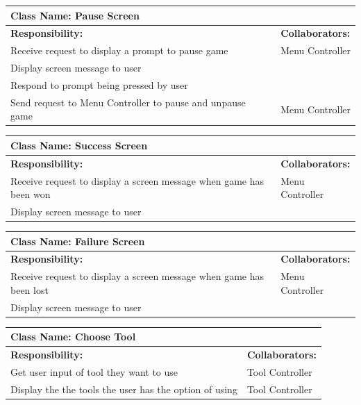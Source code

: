 \documentclass[12pt, titlepage]{article}
\begin{document}
\begin{enumerate}[a)]
	\begin{table}[H]
		\centering
		\begin{tabular}{|p{5cm}|p{5cm}|}
		\hline 
		 \multicolumn{2}{|l|}{\textbf{Class Name: Pause Screen}} \\
		\hline
		\textbf{Responsibility:} & \textbf{Collaborators:} \\
		\hline
		 Receive request to display a prompt to pause game& Menu Controller \\
		\hline
		 Display screen message to user& \\
		\hline
		 Respond to prompt being pressed by user& \\
		\hline
		 Send request to Menu Controller to pause and unpause game& Menu Controller \\
		\hline
		\end{tabular}
	\end{table}
	
	\begin{table}[H]
		\centering
		\begin{tabular}{|p{5cm}|p{5cm}|}
		\hline 
		 \multicolumn{2}{|l|}{\textbf{Class Name: Success Screen}} \\
		\hline
		\textbf{Responsibility:} & \textbf{Collaborators:} \\
		\hline
		 Receive request to display a screen message when game has been won& Menu Controller \\
		\hline
		 Display screen message to user& \\
		\hline
		\end{tabular}
	\end{table}
	
	\begin{table}[H]
		\centering
		\begin{tabular}{|p{5cm}|p{5cm}|}
		\hline 
		 \multicolumn{2}{|l|}{\textbf{Class Name: Failure Screen}} \\
		\hline
		\textbf{Responsibility:} & \textbf{Collaborators:} \\
		\hline
		 Receive request to display a screen message when game has been lost& Menu Controller \\
		\hline
		 Display screen message to user& \\
		\hline
		\end{tabular}
	\end{table}	

	\begin{table}[H]
		\centering
		\begin{tabular}{|p{5cm}|p{5cm}|}
		\hline 
		 \multicolumn{2}{|l|}{\textbf{Class Name: Choose Tool}} \\
		\hline
		\textbf{Responsibility:} & \textbf{Collaborators:} \\
		\hline
		 Get user input of tool they want to use & Tool Controller\\
		\hline
		 Display the the tools the user has the option of using & Tool Controller \\
		\hline
		\end{tabular}
	\end{table}
	

\end{enumerate}
\end{document}
